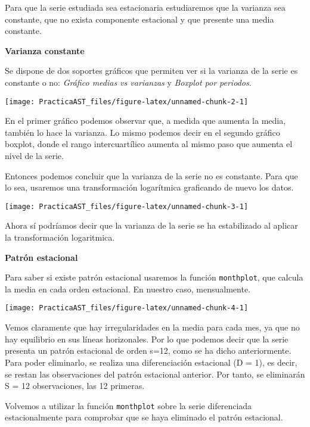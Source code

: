 \documentclass[
]{article}
\begin{document}
Para que la serie estudiada sea estacionaria estudiaremos que la
varianza sea constante, que no exista componente estacional y que
presente una media constante.

\textbf{Varianza constante}

Se dispone de dos soportes gráficos que permiten ver si la varianza de
la serie es constante o no: \emph{Gráfico medias vs varianzas} y
\emph{Boxplot por periodos}.

\begin{center}\texttt{[image: PracticaAST\_files/figure-latex/unnamed-chunk-2-1]} \end{center}

En el primer gráfico podemos observar que, a medida que aumenta la
media, también lo hace la varianza. Lo mismo podemos decir en el segundo
gráfico boxplot, donde el rango intercuartílico aumenta al mismo paso
que aumenta el nivel de la serie.

Entonces podemos concluir que la varianza de la serie no es constante.
Para que lo sea, usaremos una transformación logarítmica graficando de
nuevo los datos.

\begin{center}\texttt{[image: PracticaAST\_files/figure-latex/unnamed-chunk-3-1]} \end{center}

Ahora sí podríamos decir que la varianza de la serie se ha estabilizado
al aplicar la transformación logaritmica.

\medskip

\textbf{Patrón estacional}

Para saber si existe patrón estacional usaremos la función
\texttt{monthplot}, que calcula la media en cada orden estacional. En
nuestro caso, mensualmente.

\begin{center}\texttt{[image: PracticaAST\_files/figure-latex/unnamed-chunk-4-1]} \end{center}

Vemos claramente que hay irregularidades en la media para cada mes, ya
que no hay equilibrio en sus líneas horizonales. Por lo que podemos
decir que la serie presenta un patrón estacional de orden s=12, como se
ha dicho anteriormente. Para poder eliminarlo, se realiza una
diferenciación estacional (D = 1), es decir, se restan las observaciones
del patrón estacional anterior. Por tanto, se eliminarán S = 12
observaciones, las 12 primeras.

Volvemos a utilizar la función \texttt{monthplot} sobre la serie
diferenciada estacionalmente para comprobar que se haya eliminado el
patrón estacional.
\end{document}
